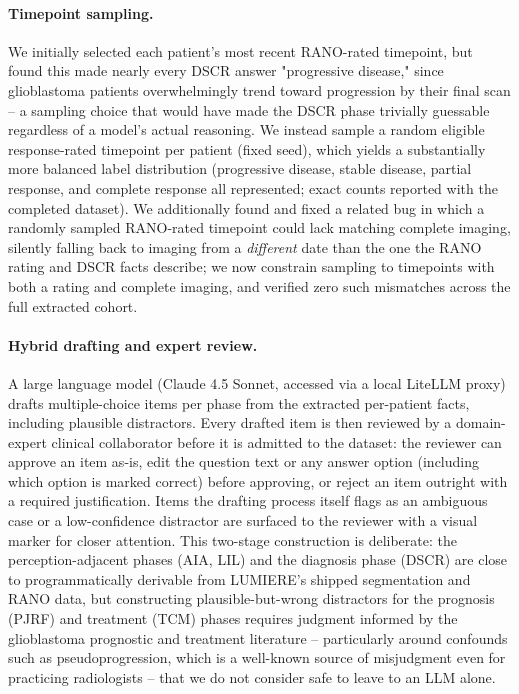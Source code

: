 \documentclass[11pt]{article}
\begin{document}
\paragraph{Timepoint sampling.} We initially selected each patient's most recent RANO-rated timepoint, but found this made nearly every DSCR answer "progressive disease," since glioblastoma patients overwhelmingly trend toward progression by their final scan -- a sampling choice that would have made the DSCR phase trivially guessable regardless of a model's actual reasoning. We instead sample a random eligible response-rated timepoint per patient (fixed seed), which yields a substantially more balanced label distribution (progressive disease, stable disease, partial response, and complete response all represented; exact counts reported with the completed dataset). We additionally found and fixed a related bug in which a randomly sampled RANO-rated timepoint could lack matching complete imaging, silently falling back to imaging from a \emph{different} date than the one the RANO rating and DSCR facts describe; we now constrain sampling to timepoints with both a rating and complete imaging, and verified zero such mismatches across the full extracted cohort.

\paragraph{Hybrid drafting and expert review.} A large language model (Claude 4.5 Sonnet, accessed via a local LiteLLM proxy) drafts multiple-choice items per phase from the extracted per-patient facts, including plausible distractors. Every drafted item is then reviewed by a domain-expert clinical collaborator before it is admitted to the dataset: the reviewer can approve an item as-is, edit the question text or any answer option (including which option is marked correct) before approving, or reject an item outright with a required justification. Items the drafting process itself flags as an ambiguous case or a low-confidence distractor are surfaced to the reviewer with a visual marker for closer attention. This two-stage construction is deliberate: the perception-adjacent phases (AIA, LIL) and the diagnosis phase (DSCR) are close to programmatically derivable from LUMIERE's shipped segmentation and RANO data, but constructing plausible-but-wrong distractors for the prognosis (PJRF) and treatment (TCM) phases requires judgment informed by the glioblastoma prognostic and treatment literature -- particularly around confounds such as pseudoprogression, which is a well-known source of misjudgment even for practicing radiologists -- that we do not consider safe to leave to an LLM alone.
\end{document}
